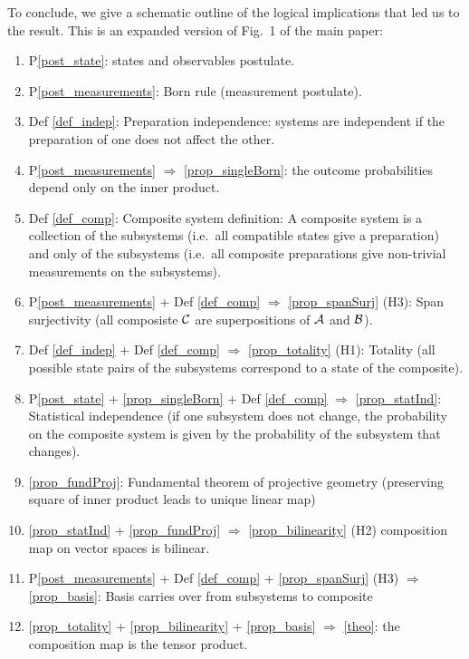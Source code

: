 \documentclass[aps,prl,amsmath,amssymb,twocolumn,nofootinbib]{revtex4}
\theoremstyle{plain}
\theoremstyle{definition}
\theoremstyle{remark}
\begin{document}
	To conclude, we give a schematic outline of the logical implications
	that led us to the result. This is an expanded version of Fig.~1 of
	the main paper:
	\begin{enumerate}
		\item P\ref{post_state}: states and observables postulate.
		
		\item P\ref{post_measurements}: Born rule (measurement postulate). 
		
		\item Def \ref{def_indep}: Preparation independence: systems are independent if the preparation of one does not affect the other.
		
		\item P\ref{post_measurements} $\Rightarrow$ \ref{prop_singleBorn}: the outcome probabilities depend only on the
		inner product.
		
		\item Def \ref{def_comp}: Composite system definition: A composite system is a
		collection of the subsystems (i.e.~all compatible states give a preparation) and only of the subsystems
		(i.e.~all composite preparations give non-trivial measurements on the
		subsystems).
		
		
		\item P\ref{post_measurements} + Def \ref{def_comp} $\Rightarrow$ \ref{prop_spanSurj} (H3): Span
		surjectivity (all composiste $\cal C$ are superpositions of ${\cal A}$ and ${\cal B}$).
		
		\item Def \ref{def_indep} + Def \ref{def_comp} $\Rightarrow$ \ref{prop_totality} (H1):
		Totality (all possible state pairs of the subsystems correspond to a state of the composite). 
		
		\item P\ref{post_state} + \ref{prop_singleBorn} +  Def \ref{def_comp} $\Rightarrow$ \ref{prop_statInd}: Statistical
		independence (if one subsystem does not change, the probability on the composite system is given by the probability of the subsystem that changes).
		
		\item \ref{prop_fundProj}: Fundamental theorem of projective geometry (preserving square of inner product leads to unique linear map)
		
		\item \ref{prop_statInd} + \ref{prop_fundProj} $\Rightarrow$ \ref{prop_bilinearity} (H2) composition map on vector spaces is bilinear.
		
		\item P\ref{post_measurements} + Def \ref{def_comp} + \ref{prop_spanSurj} (H3) $\Rightarrow$ \ref{prop_basis}: Basis
		carries over from subsystems to composite
		
		\item \ref{prop_totality} + \ref{prop_bilinearity} + \ref{prop_basis} $\Rightarrow$ \ref{theo}: the composition map is the tensor product.
	\end{enumerate}
\end{document}
